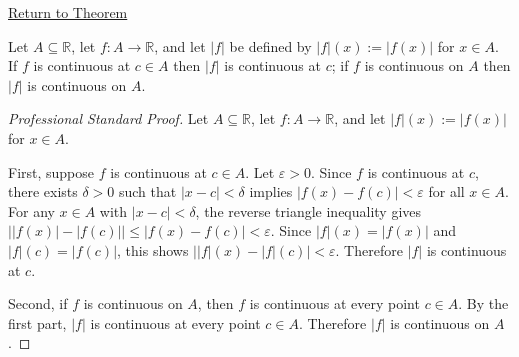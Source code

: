 \newpage
{}
\label{prf:absolute-value-preserves-continuity}

\begin{remark*}[Return]
\hyperref[thm:absolute-value-preserves-continuity]{Return to Theorem}
\end{remark*}

\begin{theorem*}
Let $A \subseteq \mathbb{R}$, let $f : A \to \mathbb{R}$, and let $|f|$ be defined by $|f|(x):=|f(x)|$ for $x\in A$. If $f$ is continuous at $c\in A$ then $|f|$ is continuous at $c$; if $f$ is continuous on $A$ then $|f|$ is continuous on $A$.
\end{theorem*}

\begin{proof}[Professional Standard Proof]
\LRAProofBodyStart
Let $A \subseteq \mathbb{R}$, let $f : A \to \mathbb{R}$, and let $|f|(x):=|f(x)|$ for $x\in A$.

First, suppose $f$ is continuous at $c\in A$. Let $\varepsilon>0$. Since $f$ is continuous at $c$, there exists $\delta>0$ such that $|x-c|<\delta$ implies $|f(x)-f(c)|<\varepsilon$ for all $x\in A$. For any $x\in A$ with $|x-c|<\delta$, the reverse triangle inequality gives $\bigl||f(x)|-|f(c)|\bigr| \le |f(x)-f(c)|<\varepsilon$. Since $|f|(x)=|f(x)|$ and $|f|(c)=|f(c)|$, this shows $\bigl||f|(x)-|f|(c)\bigr|<\varepsilon$. Therefore $|f|$ is continuous at $c$.

Second, if $f$ is continuous on $A$, then $f$ is continuous at every point $c\in A$. By the first part, $|f|$ is continuous at every point $c\in A$. Therefore $|f|$ is continuous on $A$.
\end{proof}

